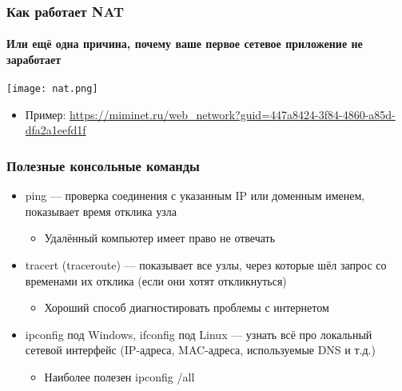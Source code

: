 \documentclass{../../slides-style}
\begin{document}
    \begin{frame}
        \frametitle{Как работает NAT}
        \framesubtitle{Или ещё одна причина, почему ваше первое сетевое приложение не заработает}
        \begin{center}
            \texttt{[image: nat.png]}
        \end{center}
        \begin{itemize}
            \item Пример: \url{https://miminet.ru/web_network?guid=447a8424-3f84-4860-a85d-dfa2a1eefd1f}
        \end{itemize}
    \end{frame}

    \begin{frame}
        \frametitle{Полезные консольные команды}
        \begin{itemize}
            \item ping --- проверка соединения с указанным IP или доменным именем, показывает время отклика узла
            \begin{itemize}
                \item Удалённый компьютер имеет право не отвечать
            \end{itemize}
            \item tracert (traceroute) --- показывает все узлы, через которые шёл запрос со временами их отклика (если они хотят откликнуться)%
            \begin{itemize}
                \item Хороший способ диагностировать проблемы с интернетом
            \end{itemize}
            \item ipconfig под Windows, ifconfig под Linux --- узнать всё про локальный сетевой интерфейс (IP-адреса, MAC-адреса, используемые DNS и т.д.)
            \begin{itemize}
                \item Наиболее полезен ipconfig /all
            \end{itemize}
        \end{itemize}
    \end{frame}
\end{document}
